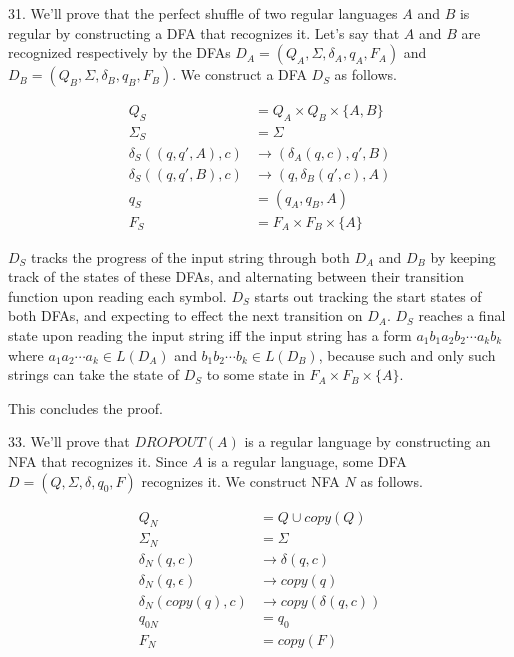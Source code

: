 \documentclass{article}
\begin{document}
31. We'll prove that the perfect shuffle of two regular languages $A$ and $B$ is regular by constructing a DFA that recognizes it. Let's say that $A$ and $B$ are recognized respectively by the DFAs $D_A = (Q_A, \Sigma, \delta_A, q_A, F_A)$ and $D_B = (Q_B, \Sigma, \delta_B, q_B, F_B)$. We construct a DFA $D_S$ as follows.

\begin{align*}
    Q_S                     &= Q_A \times Q_B \times \{A, B\} \\
    \Sigma_S                &= \Sigma \\
    \delta_S((q, q', A), c) &\rightarrow (\delta_A(q, c), q', B) \\
    \delta_S((q, q', B), c) &\rightarrow (q, \delta_B(q', c), A) \\
    q_S                     &= (q_A, q_B, A) \\
    F_S                     &= F_A \times F_B \times \{A\}
\end{align*}

$D_S$ tracks the progress of the input string through both $D_A$ and $D_B$ by keeping track of the states of these DFAs, and alternating between their transition function upon reading each symbol. $D_S$ starts out tracking the start states of both DFAs, and expecting to effect the next transition on $D_A$. $D_S$ reaches a final state upon reading the input string iff the input string has a form $a_1 b_1 a_2 b_2 \cdots a_k b_k$ where $a_1 a_2 \cdots a_k \in L(D_A)$ and $b_1 b_2 \cdots b_k \in L(D_B)$, because such and only such strings can take the state of $D_S$ to some state in $F_A \times F_B \times \{A\}$. 

This concludes the proof.

33. We'll prove that $DROPOUT(A)$ is a regular language by constructing an NFA that recognizes it. Since $A$ is a regular language, some DFA $D = (Q, \Sigma, \delta, q_0, F)$ recognizes it. We construct NFA $N$ as follows.

\begin{align*}
    Q_N                   &= Q \cup copy(Q) \\
    \Sigma_N              &= \Sigma \\
    \delta_N(q, c)        &\rightarrow \delta(q, c) \\
    \delta_N(q, \epsilon) &\rightarrow copy(q) \\
    \delta_N(copy(q), c)  &\rightarrow copy(\delta(q, c)) \\
    q_{0N}                &= q_0 \\
    F_N                   &= copy(F)
\end{align*}
\end{document}
